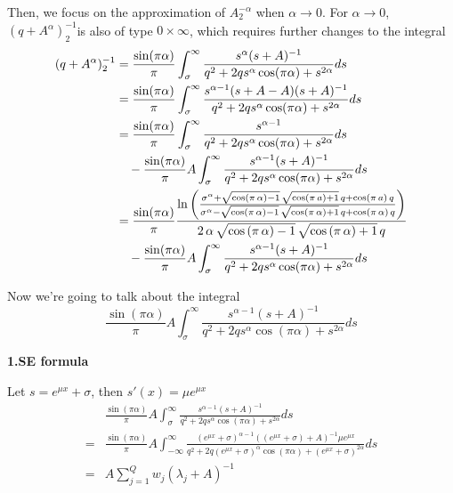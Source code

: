 Then, we focus on the approximation of $A_2^{-\alpha}$ when $\alpha \rightarrow 0 $. For $\alpha\rightarrow 0$, $(q+A^{\alpha})^{-1}_2$is also of type $0 \times \infty$, which requires further changes to the integral
\begin{equation}
	\begin{aligned}
		(q+A^{\alpha})^{-1}_2&=\frac{\sin(\pi \alpha)}{\pi}\int_{\sigma}^{\infty}\frac{s^{\alpha}(s+{A})^{-1}}{q^2+2qs^{\alpha}\cos(\pi\alpha)+s^{2\alpha}}ds\\
		&=\frac{\sin(\pi \alpha)}{\pi}\int_{\sigma}^{\infty}\frac{s^{\alpha-1}(s+A-A)(s+{A})^{-1}}{q^2+2qs^{\alpha}\cos(\pi\alpha)+s^{2\alpha}}ds\\
		&=\frac{\sin(\pi \alpha)}{\pi}\int_{\sigma}^{\infty}\frac{s^{\alpha-1}}{q^2+2qs^{\alpha}\cos(\pi\alpha)+s^{2\alpha}}ds\\
		&\quad -\frac{\sin(\pi \alpha)}{\pi}A\int_{\sigma}^{\infty}\frac{s^{\alpha-1}(s+{A})^{-1}}{q^2+2qs^{\alpha}\cos(\pi\alpha)+s^{2\alpha}}ds\\
		&=\frac{\sin(\pi \alpha)}{\pi}
		{{\ln \left(\frac{\sigma^{\alpha}+\sqrt{\cos \left(\pi\,\alpha \right)-1}\,\sqrt{\cos
						\left(\pi\,a\right)+1}\,q+\cos \left(\pi\,a\right)\,q}{\sigma^{\alpha}-\sqrt{\cos \left(\pi\,\alpha\right)-1}\,\sqrt{\cos \left(\pi
						\,\alpha\right)+1}\,q+\cos \left(\pi\,\alpha \right)\,q}\right)}\over{2\,\alpha\,
				\sqrt{\cos \left(\pi\,\alpha\right)-1}\,\sqrt{\cos \left(\pi\,\alpha\right)+1}
				\,q}}\\
		&\quad -\frac{\sin(\pi \alpha)}{\pi}A\int_{\sigma}^{\infty}\frac{s^{\alpha-1}(s+{A})^{-1}}{q^2+2qs^{\alpha}\cos(\pi\alpha)+s^{2\alpha}}ds
	\end{aligned}
\label{q2}
\end{equation}

Now we're going to talk about the integral
\begin{equation}
	\frac{\sin(\pi \alpha)}{\pi}A\int_{\sigma}^{\infty}\frac{s^{\alpha-1}(s+{A})^{-1}}{q^2+2qs^{\alpha}\cos(\pi\alpha)+s^{2\alpha}}ds
\end{equation}

\textbf{1.SE formula }

Let $s=e^{\mu x}+\sigma$, then $s'(x)=\mu e^{\mu x}$
\begin{equation}
	\begin{aligned}
		&\frac{\sin(\pi\alpha)}{\pi}A\int_{\sigma}^{\infty}\frac{s^{\alpha-1}(s+{A})^{-1}}{q^2+2qs^{\alpha}\cos(\pi\alpha)+s^{2\alpha}}ds\\
		=&\frac{\sin(\pi\alpha)}{\pi}A\int_{-\infty}^{\infty}\frac{(e^{\mu x}+\sigma)^{\alpha-1}((e^{\mu x}+\sigma)+{A})^{-1}\mu e^{\mu x}}{q^2+2q(e^{\mu x}+\sigma)^{\alpha}\cos(\pi\alpha)+(e^{\mu x}+\sigma)^{2\alpha}}ds\\
		= & A\sum_{j=1}^{Q}w_j(\lambda_j+A)^{-1}
	\end{aligned}
\end{equation}

